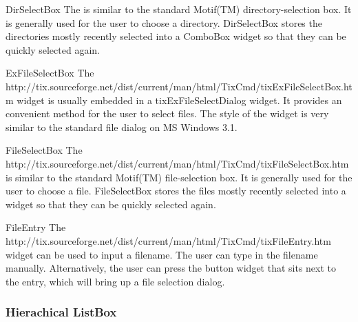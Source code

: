 
\begin{classdesc}{DirSelectBox}{}
The  is similar
to the standard Motif(TM) directory-selection box. It is generally used for
the user to choose a directory. DirSelectBox stores the directories mostly
recently selected into a ComboBox widget so that they can be quickly
selected again.
\end{classdesc}

\begin{classdesc}{ExFileSelectBox}{}
The 
{http://tix.sourceforge.net/dist/current/man/html/TixCmd/tixExFileSelectBox.htm}
widget is usually embedded in a tixExFileSelectDialog widget. It
provides an convenient method for the user to select files. The style
of the  widget is very similar to the standard
file dialog on MS Windows 3.1.
\end{classdesc}


\begin{classdesc}{FileSelectBox}{}
The 
{http://tix.sourceforge.net/dist/current/man/html/TixCmd/tixFileSelectBox.htm}
is similar to the standard Motif(TM) file-selection box. It is
generally used for the user to choose a file. FileSelectBox stores the
files mostly recently selected into a  widget so that
they can be quickly selected again.
\end{classdesc}


\begin{classdesc}{FileEntry}{}
The 
{http://tix.sourceforge.net/dist/current/man/html/TixCmd/tixFileEntry.htm}
widget can be used to input a filename. The user can type in the
filename manually. Alternatively, the user can press the button widget
that sits next to the entry, which will bring up a file selection
dialog.
\end{classdesc}



\subsubsection{Hierachical ListBox}

